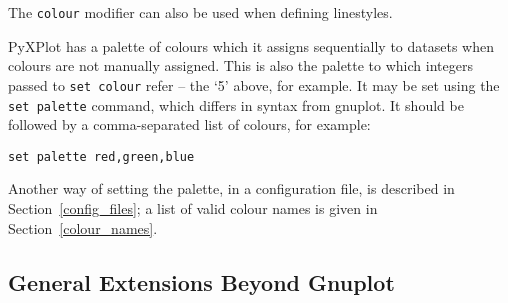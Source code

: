 \documentclass[a4paper,onecolumn,11pt]{book}
\begin{document}
\noindent The \texttt{colour} modifier can also be used when defining linestyles.

 PyXPlot has a palette of colours which it assigns
sequentially to datasets when colours are not manually assigned. This is also
the palette to which integers passed to \texttt{set colour} refer -- the `5'
above, for example. It may be set using the \texttt{set palette} command, which
differs in syntax from gnuplot. It should be followed by a comma-separated list
of colours, for example:

\begin{verbatim}
set palette red,green,blue
\end{verbatim}

Another way of setting the palette, in a configuration file, is described in
Section~\ref{config_files}; a list of valid colour names is given in
Section~\ref{colour_names}.

\subsection{General Extensions Beyond Gnuplot}
\end{document}
